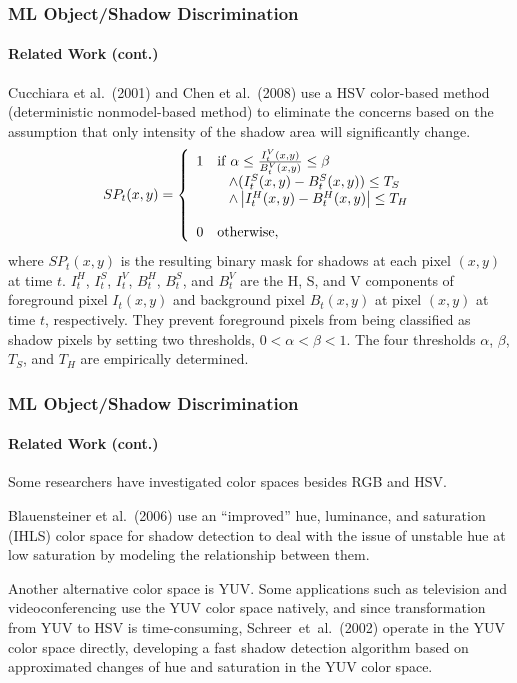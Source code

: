 
\begin{frame}
    \frametitle{ML Object/Shadow Discrimination}
    \framesubtitle{Related Work (cont.)}

    Cucchiara et al.\ (2001) and Chen et al.\ (2008) use a HSV 
    color-based method (deterministic nonmodel-based method) 
    to eliminate the concerns based on the assumption that 
    only intensity of the shadow area will significantly change. 
    \[
        SP_t (x,y) = \left\{ 
        \begin{array}{ll}
            1 & {\rm if} \; \alpha \le \frac{{I_t^V (x,y)}}{{B_t^V (x,y)}} \le \beta\\ 
              & \;\;\; \wedge (I_t^S (x,y) - B_t^S (x,y)) \le T_S  \\ 
              & \;\;\; \wedge \left| {I_t^H (x,y) - B_t^H (x,y)} \right| \le T_H\\ \\
            0 & {\rm otherwise}, \\ 
        \end{array} \right.
    \]
    where $SP_t(x,y)$ is the resulting binary mask for shadows at each
    pixel $(x,y)$ at time $t$.  $I_t^H$, $I_t^S$, $I_t^V$, $B_t^H$,
    $B_t^S$, and $B_t^V$ are the H, S, and V components of foreground
    pixel $I_t(x,y)$ and background pixel $B_t(x, y)$ at pixel $(x,y)$ at
    time $t$, respectively.  They prevent foreground pixels from being
    classified as shadow pixels by setting two thresholds, $0 < \alpha <
    \beta < 1$.  The four thresholds $\alpha$, $\beta$, $T_S$, and $T_H$
    are empirically determined.
  
\end{frame}


\begin{frame}
    \frametitle{ML Object/Shadow Discrimination}
    \framesubtitle{Related Work (cont.)}

    Some researchers have investigated color spaces besides RGB and
    HSV. 
  
    \bigskip

    Blauensteiner et al.\ (2006) use an ``improved''
    hue, luminance, and saturation (IHLS) color space for shadow detection
    to deal with the issue of unstable hue at low saturation by modeling
    the relationship between them.

    \bigskip

    Another alternative color space is YUV.  Some applications such as
    television and videoconferencing use the YUV color space natively, and
    since transformation from YUV to HSV is time-consuming, 
    Schreer~et~al.~(2002) operate in the YUV color space directly,
    developing a fast shadow detection algorithm based on approximated
    changes of hue and saturation in the YUV color space.

\end{frame}

